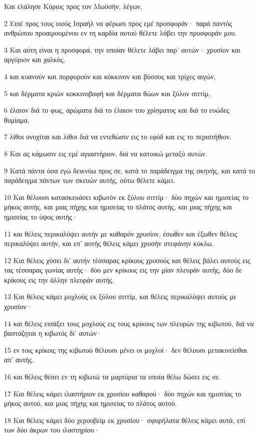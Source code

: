 \par Και ελάλησε Κύριος προς τον Μωϋσήν, λέγων,
\par 2 Ειπέ προς τους υιούς Ισραήλ να φέρωσι προς εμέ προσφοράν· παρά παντός ανθρώπου προαιρουμένου εν τη καρδία αυτού θέλετε λάβει την προσφοράν μου.
\par 3 Και αύτη είναι η προσφορά, την οποίαν θέλετε λάβει παρ' αυτών· χρυσίον και αργύριον και χαλκός,
\par 4 και κυανούν και πορφυρούν και κόκκινον και βύσσος και τρίχες αιγών,
\par 5 και δέρματα κριών κοκκινοβαφή και δέρματα θώων και ξύλον σιττίμ,
\par 6 έλαιον διά το φως, αρώματα διά το έλαιον του χρίσματος και διά το ευώδες θυμίαμα,
\par 7 λίθοι ονυχίται και λίθοι διά να εντεθώσιν εις το εφόδ και εις το περιστήθιον.
\par 8 Και ας κάμωσιν εις εμέ αγιαστήριον, διά να κατοικώ μεταξύ αυτών.
\par 9 Κατά πάντα όσα εγώ δεικνύω προς σε, κατά το παράδειγμα της σκηνής, και κατά το παράδειγμα πάντων των σκευών αυτής, ούτω θέλετε κάμει.
\par 10 Και θέλουσι κατασκευάσει κιβωτόν εκ ξύλου σιττίμ· δύο πηχών και ημισείας το μήκος αυτής, και μιας πήχης και ημισείας το πλάτος αυτής, και μιας πήχης και ημισείας το ύψος αυτής·
\par 11 και θέλεις περικαλύψει αυτήν με καθαρόν χρυσίον, έσωθεν και έξωθεν θέλεις περικαλύψει αυτήν, και επ' αυτής θέλεις κάμει χρυσήν στεφάνην κύκλω.
\par 12 Και θέλεις χύσει δι' αυτήν τέσσαρας κρίκους χρυσούς και θέλεις βάλει αυτούς εις τας τέσσαρας γωνίας αυτής· δύο μεν κρίκους εις την μίαν πλευράν αυτής, δύο δε κρίκους εις την άλλην πλευράν αυτής.
\par 13 Και θέλεις κάμει μοχλούς εκ ξύλου σιττίμ, και θέλεις περικαλύψει αυτούς με χρυσίον·
\par 14 και θέλεις εισάξει τους μοχλούς εις τους κρίκους των πλευρών της κιβωτού, διά να βαστάζηται η κιβωτός δι' αυτών·
\par 15 εν τοις κρίκοις της κιβωτού θέλουσι μένει οι μοχλοί· δεν θέλουσι μετακινείσθαι απ' αυτής.
\par 16 και θέλεις θέσει εν τη κιβωτώ τα μαρτύρια τα οποία θέλω δώσει εις σε.
\par 17 Και θέλεις κάμει ιλαστήριον εκ χρυσίου καθαρού· δύο πηχών και ημισείας το μήκος αυτού, και μιας πήχης και ημισείας το πλάτος αυτού.
\par 18 Και θέλεις κάμει δύο χερουβείμ εκ χρυσίου· σφυρήλατα θέλεις κάμει αυτά, επί των δύο άκρων του ιλαστηρίου·
